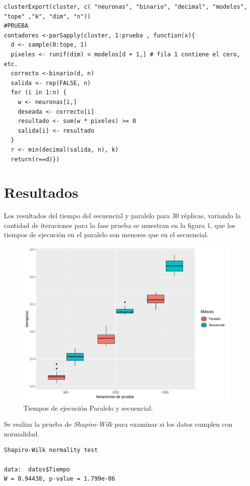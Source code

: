 \documentclass[10pt,a4paper]{article}
\begin{document}
\begin{lstlisting} 
clusterExport(cluster, c( "neuronas", "binario", "decimal", "modelos", "tope" ,"k", "dim", "n"))
#PRUEBA 
contadores <-parSapply(cluster, 1:prueba , function(x){
  d <- sample(0:tope, 1)
  pixeles <- runif(dim) < modelos[d + 1,] # fila 1 contiene el cero, etc.
  correcto <-binario(d, n)
  salida <- rep(FALSE, n)
  for (i in 1:n) {
    w <- neuronas[i,]
    deseada <- correcto[i]
    resultado <- sum(w * pixeles) >= 0
    salida[i] <- resultado
  }
  r <- min(decimal(salida, n), k) 
  return(r==d)})

\end{lstlisting}
\newpage
\section*{Resultados}
Los resultados del tiempo del secuencial y paralelo para 30 réplicas, variando la cantidad de iteraciones para la fase prueba se muestran en la figura 1, que los tiempos de ejecución en el paralelo son menores que en el secuencial. 

\begin{figure}[ht]
  \centering
  \includegraphics[scale=.7]{tarea}
  \caption{Tiempos de ejecución Paralelo y secuencial.}
\end{figure}

 
Se realiza la prueba de \emph{Shapiro-Wilk} para examinar si los datos cumplen con normalidad. 
\begin{lstlisting}
Shapiro-Wilk normality test

data:  datos$Tiempo
W = 0.94438, p-value = 1.799e-06

\end{lstlisting}
\vspace{0.5cm}
\end{document}
